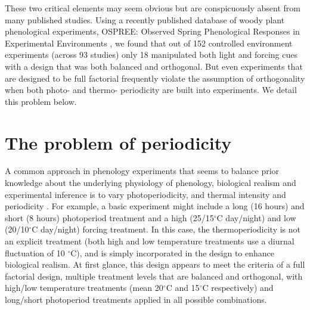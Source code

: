 \documentclass[11pt]{article}
\begin{document}
These two critical elements may seem obvious but are conspicuously absent from many published studies.  Using a recently published database of woody plant phenological experiments, OSPREE: Observed Spring Phenological Responses in Experimental Environments \citep{wolkovich2019}, we found that out of 152 controlled environment experiments (across 93 studies) only 18 manipulated both light and forcing cues with a design that was both balanced and orthogonal. But even experiments that are designed to be full factorial frequently violate the assumption of orthogonality when both photo- and thermo- periodicity are built into experiments. We detail this problem below.

\section*{The problem of periodicity}
A common approach in phenology experiments that seems to balance prior knowledge about the underlying physiology of phenology, biological realism and experimental inference is to vary photoperiodicity, and thermal intensity and periodicity \citep[e.g.,][]{Flynn2018,Sanz-Perez:2009aa,Basler:2014aa}. For example, a basic experiment might include a long (16 hours) and short (8 hours) photoperiod treatment and a high (25/15$^{\circ}$C day/night) and low (20/10$^{\circ}$C day/night) forcing treatment. In this case, the thermoperiodicity is not an explicit treatment (both high and low temperature treatments use a diurnal fluctuation of 10 $^{\circ}$C), and is simply incorporated in the design to enhance biological realism. At first glance, this design appears to meet the criteria of a full factorial design, multiple treatment levels that are balanced and orthogonal, with high/low temperature treatments (mean 20$^{\circ}$C and 15$^{\circ}$C respectively) and long/short photoperiod treatments applied in all possible combinations.
\end{document}
